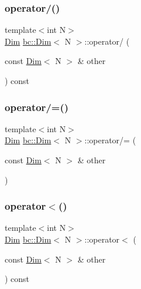 \mbox{\label{structbc_1_1Dim_a4726afdb4e1f21b759b16ef07bd0f60f}} 
\subsubsection{\texorpdfstring{operator/()}{operator/()}}
{\footnotesize\ttfamily template$<$int N$>$ \\
\hyperlink{structbc_1_1Dim}{Dim} \hyperlink{structbc_1_1Dim}{bc\+::\+Dim}$<$ N $>$\+::operator/ (\begin{DoxyParamCaption}\item[{const \hyperlink{structbc_1_1Dim}{Dim}$<$ N $>$ \&}]{other }\end{DoxyParamCaption}) const\hspace{0.3cm}{\ttfamily [inline]}}

\mbox{\label{structbc_1_1Dim_a9bf1f0f74354070f8927a15f96faf158}} 
\subsubsection{\texorpdfstring{operator/=()}{operator/=()}}
{\footnotesize\ttfamily template$<$int N$>$ \\
\hyperlink{structbc_1_1Dim}{Dim} \hyperlink{structbc_1_1Dim}{bc\+::\+Dim}$<$ N $>$\+::operator/= (\begin{DoxyParamCaption}\item[{const \hyperlink{structbc_1_1Dim}{Dim}$<$ N $>$ \&}]{other }\end{DoxyParamCaption})\hspace{0.3cm}{\ttfamily [inline]}}

\mbox{\label{structbc_1_1Dim_a8ae92350cf75b23f2845e4c708081798}} 
\subsubsection{\texorpdfstring{operator$<$()}{operator<()}}
{\footnotesize\ttfamily template$<$int N$>$ \\
\hyperlink{structbc_1_1Dim}{Dim} \hyperlink{structbc_1_1Dim}{bc\+::\+Dim}$<$ N $>$\+::operator$<$ (\begin{DoxyParamCaption}\item[{const \hyperlink{structbc_1_1Dim}{Dim}$<$ N $>$ \&}]{other }\end{DoxyParamCaption}) const\hspace{0.3cm}{\ttfamily [inline]}}

